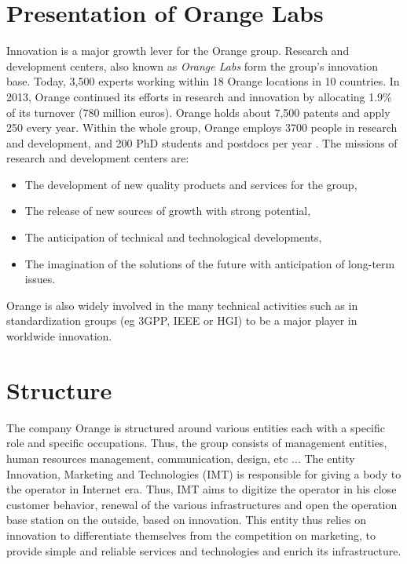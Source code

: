 
\section{Presentation of Orange Labs}
Innovation is a major growth lever for the Orange group. Research and development centers, also known as \textit{Orange Labs} form the group's innovation base. Today, 3,500 experts working within 18 Orange locations in 10 countries. In 2013, Orange continued its efforts in research and innovation by allocating 1.9\% of its turnover (780 million euros). Orange holds about 7,500 patents and apply 250 every year. Within the whole group, Orange employs 3700 people in research and development, and 200 PhD students and postdocs per year . The missions of research and development centers are:

\begin{itemize}
	\item The development of new quality products and services for the group,
	\item The release of new sources of growth with strong potential,
	\item The anticipation of technical and technological developments,
 	\item	The imagination of the solutions of the future with anticipation of long-term issues.
\end{itemize}

Orange is also widely involved in the many technical activities such as in standardization groups (eg 3GPP, IEEE or HGI) to be a major player in worldwide innovation.

\section{Structure}
The company Orange is structured around various entities each with a specific role and specific occupations. Thus, the group consists of management entities, human resources management, communication, design, etc ... The entity Innovation, Marketing and Technologies (IMT) is responsible for giving a body to the operator in Internet era. Thus, IMT aims to digitize the operator in his close customer behavior, renewal of the various infrastructures and open the operation base station on the outside, based on innovation. This entity thus relies on innovation to differentiate themselves from the competition on marketing, to provide simple and reliable services and technologies and enrich its infrastructure.


